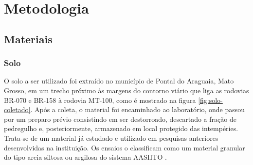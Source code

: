
\chapter[METODOLOGIA]{Metodologia}






\section{Materiais}

\subsection{Solo}

O solo a ser utilizado foi extraído no município de Pontal do Araguaia, Mato Grosso, em um trecho próximo às margens do contorno viário que liga as rodovias BR-070 e BR-158 à rodovia MT-100, como é mostrado na figura \ref{fig:solo-coletado}. Após a coleta, o material foi encaminhado ao laboratório, onde passou por um preparo prévio consistindo em ser destorroado, descartado a fração de pedregulho e, posteriormente, armazenado em local protegido das intempéries. Trata-se de um material já estudado e utilizado em pesquisas anteriores desenvolvidas na instituição. Os ensaios o classificam como um material granular do tipo areia siltosa ou argilosa do sistema AASHTO \cite{Barroso2019,Junior2021, Silva2019,Novato2019,Soler2021}. 

